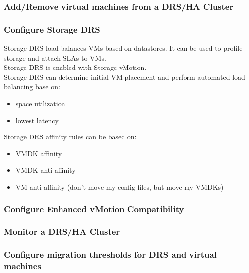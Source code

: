 \subsubsection{Add/Remove virtual machines from a DRS/HA Cluster}

\subsubsection{Configure Storage DRS}

Storage DRS load balances VMs based on datastores. It can be used to profile
storage and attach SLAs to VMs.\\

Storage DRS is enabled with Storage vMotion.\\

Storage DRS can determine initial VM placement and perform automated load
balancing base on:

\begin{itemize}

\item space utilization
\item lowest latency

\end{itemize}

Storage DRS affinity rules can be based on:

\begin{itemize}

\item VMDK affinity
\item VMDK anti-affinity
\item VM anti-affinity (don't move my config files, but move my VMDKs)

\end{itemize}

\subsubsection{Configure Enhanced vMotion Compatibility}

\subsubsection{Monitor a DRS/HA Cluster}

\subsubsection{Configure migration thresholds for DRS and virtual machines}

